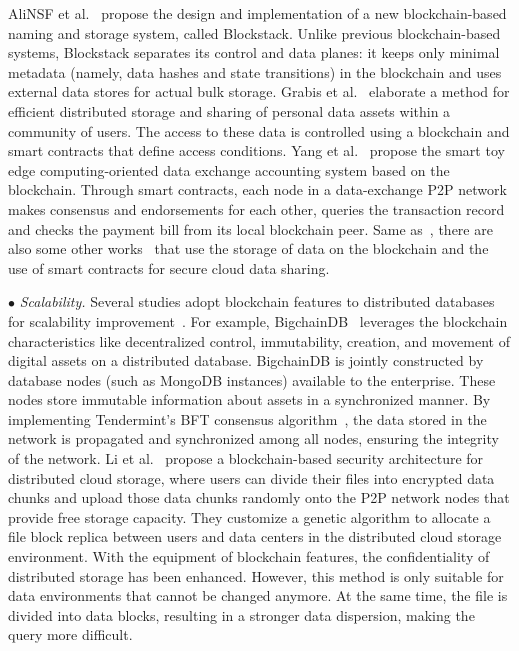 \documentclass[acmsmall]{acmart}
\begin{document}
AliNSF et al.~\cite{DBLP:conf/usenix/AliNSF16} propose the design and implementation of a new blockchain-based naming and storage system, called Blockstack. Unlike previous blockchain-based systems, Blockstack separates its control and data planes: it keeps only minimal metadata (namely, data hashes and state transitions) in the blockchain and uses external data stores for actual bulk storage. Grabis et al.~\cite{DBLP:conf/icde/GrabisSZ20} elaborate a method for efficient distributed storage and sharing of personal data assets within a community of users. The access to these data is controlled using a blockchain and smart contracts that define access conditions. Yang et al.~\cite{DBLP:journals/jsa/YangLW18} propose the smart toy edge computing-oriented data exchange accounting system based on the blockchain. Through smart contracts, each node in a data-exchange P2P network makes consensus and endorsements for each other, queries the transaction record and checks the payment bill from its local blockchain peer. Same as~\cite{DBLP:journals/jsa/YangLW18}, there are also some other works~\cite{DBLP:conf/icde/KonstaMDNK21,DBLP:journals/jsa/AliGAL19,DBLP:journals/jsa/EltayiebEHL20,DBLP:journals/jsa/QinHYL21} that use the storage of data on the blockchain and the use of smart contracts for secure cloud data sharing.





$\bullet$ {\it Scalability.}
Several studies adopt blockchain features to distributed databases for scalability improvement~\cite{mcconaghy2016bigchaindb, li2018block}. For example, BigchainDB~\cite{mcconaghy2016bigchaindb} leverages the blockchain characteristics like decentralized control, immutability, creation, and movement of digital assets on a distributed database. BigchainDB is jointly constructed by database nodes (such as MongoDB instances) available to the enterprise. These nodes store immutable information about assets in a synchronized manner. By implementing Tendermint's BFT consensus algorithm~\cite{buchman2018latest}, the data stored in the network is propagated and synchronized among all nodes, ensuring the integrity of the network. Li et al.~\cite{li2018block} propose a blockchain-based security architecture for distributed cloud storage, where users can divide their files into encrypted data chunks and upload those data chunks randomly onto the P2P network nodes that provide free storage capacity. They customize a genetic algorithm to allocate a file block replica between users and data centers in the distributed cloud storage environment.
With the equipment of blockchain features, the confidentiality of distributed storage has been enhanced. However, this method is only suitable for data environments that cannot be changed anymore. At the same time, the file is divided into data blocks, resulting in a stronger data dispersion, making the query more difficult.
\end{document}
